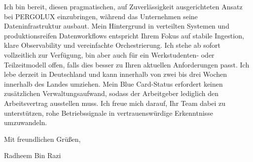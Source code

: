 \documentclass[11pt,a4paper]{coverletter}
\begin{document}
Ich bin bereit, diesen pragmatischen, auf Zuverlässigkeit ausgerichteten Ansatz bei PERGOLUX einzubringen, während das Unternehmen seine Dateninfrastruktur ausbaut. Mein Hintergrund in verteilten Systemen und produktionsreifen Datenworkflows entspricht Ihrem Fokus auf stabile Ingestion, klare Observability und vereinfachte Orchestrierung. Ich stehe ab sofort vollzeitlich zur Verfügung, bin aber auch für ein Werkstudenten- oder Teilzeitmodell offen, falls dies besser zu Ihren aktuellen Anforderungen passt. Ich lebe derzeit in Deutschland und kann innerhalb von zwei bis drei Wochen innerhalb des Landes umziehen. Mein Blue Card-Status erfordert keinen zusätzlichen Verwaltungsaufwand, sodass der Arbeitgeber lediglich den Arbeitsvertrag ausstellen muss. Ich freue mich darauf, Ihr Team dabei zu unterstützen, rohe Betriebssignale in vertrauenswürdige Erkenntnisse umzuwandeln.

\closing{Mit freundlichen Grüßen,}{Radheem Bin Razi}
\end{document}
